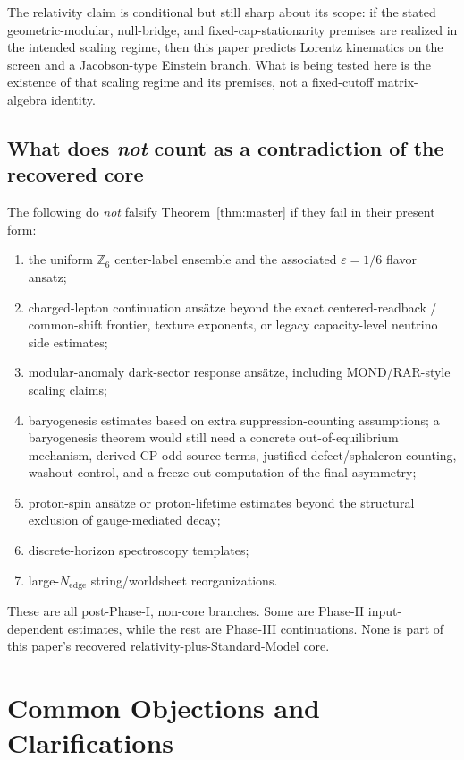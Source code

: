 \documentclass[11pt]{article}
\begin{document}
The relativity claim is conditional but still sharp about its scope: if the stated geometric-modular, null-bridge, and fixed-cap-stationarity premises are realized in the intended scaling regime, then this paper predicts Lorentz kinematics on the screen and a Jacobson-type Einstein branch. What is being tested here is the existence of that scaling regime and its premises, not a fixed-cutoff matrix-algebra identity.

\subsection{What does \emph{not} count as a contradiction of the recovered core}

The following do \emph{not} falsify Theorem~\ref{thm:master} if they fail in their present form:
\begin{enumerate}[leftmargin=2em]
\item the uniform $\mathbb Z_6$ center-label ensemble and the associated $\varepsilon=1/6$ flavor ansatz;
\item charged-lepton continuation ans\"atze beyond the exact centered-readback / common-shift frontier, texture exponents, or legacy capacity-level neutrino side estimates;
\item modular-anomaly dark-sector response ans\"atze, including MOND/RAR-style scaling claims;
\item baryogenesis estimates based on extra suppression-counting assumptions; a baryogenesis theorem would still need a concrete out-of-equilibrium mechanism, derived CP-odd source terms, justified defect/sphaleron counting, washout control, and a freeze-out computation of the final asymmetry;
\item proton-spin ans\"atze or proton-lifetime estimates beyond the structural exclusion of gauge-mediated decay;
\item discrete-horizon spectroscopy templates;
\item large-$N_{\mathrm{edge}}$ string/worldsheet reorganizations.
\end{enumerate}
These are all post-Phase-I, non-core branches. Some are Phase-II input-dependent estimates, while the rest are Phase-III continuations. None is part of this paper's recovered relativity-plus-Standard-Model core.

\section{Common Objections and Clarifications}
\end{document}
